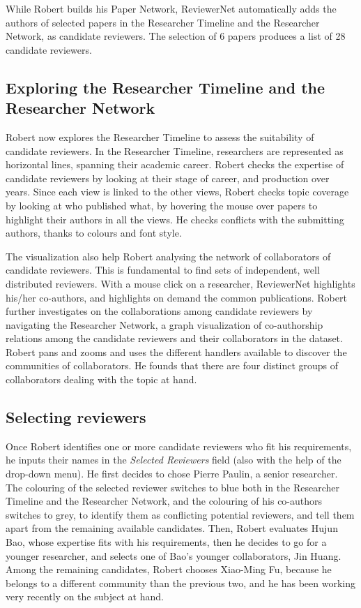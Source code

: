 While Robert builds his Paper Network, ReviewerNet automatically adds the authors of selected papers in the Researcher Timeline and the Researcher Network, as candidate reviewers.  The selection of 6 papers produces a list of 28 candidate reviewers. 


\subsection{Exploring the Researcher Timeline and the Researcher Network} 
 
Robert now explores the Researcher Timeline to assess the suitability of candidate reviewers. In the Researcher Timeline, researchers are represented as horizontal lines, spanning their academic career. Robert checks the expertise of candidate reviewers by looking at their stage of career, and production over years. Since each view is linked to the other views, Robert checks topic coverage by looking at who published what, by hovering the mouse over papers to highlight their authors in all the views. He checks conflicts with the submitting authors, thanks to colours and font style. 

The visualization also help Robert analysing the network of collaborators of candidate reviewers. This is fundamental to find sets of independent, well distributed reviewers. With a mouse click on a researcher, ReviewerNet highlights his/her co-authors, and highlights on demand the common publications. Robert further investigates on the collaborations among candidate reviewers by navigating the Researcher Network, a graph visualization of co-authorship relations among the candidate reviewers and their collaborators in the dataset. Robert pans and zooms and uses the different handlers available to discover the communities of collaborators. He founds that there are four distinct groups of collaborators dealing with the topic at hand.

\subsection{Selecting reviewers} 

Once Robert identifies one or more candidate reviewers who fit his requirements, he inputs their names in the \emph{Selected Reviewers} field (also with the help of the drop-down menu). He first decides to chose Pierre Paulin, a senior researcher. The colouring of the selected reviewer switches to blue both in the Researcher Timeline and the Researcher Network, and the colouring of his co-authors switches to grey, to identify them as conflicting potential reviewers, and tell them apart from the remaining available candidates. Then, Robert evaluates Hujun Bao, whose expertise fits with his requirements, then he decides to go for a younger researcher, and selects one of Bao's younger collaborators, Jin Huang. Among the remaining candidates, Robert chooses Xiao-Ming Fu, because he belongs to a different community than the previous two, and he has been working very recently on the subject at hand. 

